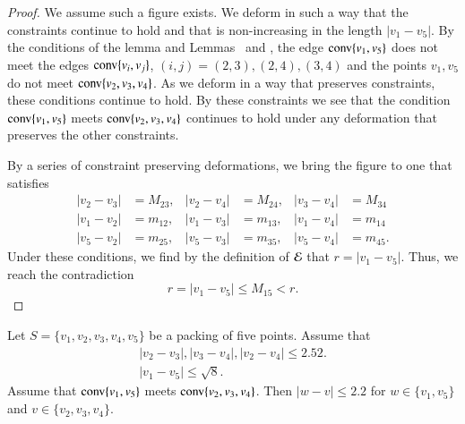 \begin{tarskidata}
\begin{tarski}
\begin{proof}
We assume such a figure exists.  We deform in such a way that the constraints continue
to hold and that is non-increasing in the length $|v_1-v_5|$.  By the conditions of the
lemma and Lemmas~ and , 
the edge ${\operatorname{conv}}\{v_1,v_5\}$
does not meet the
 edges ${\operatorname{conv}}\{v_i,v_j\}$, $(i,j)=(2,3),(2,4),(3,4)$ 
and the points $v_1,v_5$
do not meet ${\operatorname{conv}}\{v_2,v_3,v_4\}$.  As we deform in a way that preserves constraints,
these conditions continue to hold.  By these constraints we see that the condition
  ${\operatorname{conv}}\{v_1,v_5\}$ meets ${\operatorname{conv}}\{v_2,v_3,v_4\}$
continues to hold under any deformation that preserves the other constraints.

By a series of constraint preserving deformations, we bring the figure to one that satisfies
	$$
	\begin{array}{rlrlrl}
	|v_2-v_3|&=M_{23}, &|v_2-v_4| &= M_{24}, &|v_3-v_4| &= M_{34}\\
	|v_1-v_2|&=m_{12}, &|v_1-v_3| &= m_{13}, &|v_1-v_4| &= m_{14}\\
	|v_5-v_2|&=m_{25}, &|v_5-v_3| &= m_{35}, &|v_5-v_4| &= m_{45}.
	\end{array}
	$$
Under these conditions, we find by the definition of ${\mathcal E}$ 
that $r = |v_1-v_5|$.  Thus, we reach the contradiction
	$$
	r = |v_1-v_5| \le M_{15} < r.
	$$
\end{proof}
\end{tarski}





\begin{tarski}

\begin{lemma} 
Let $S=\{v_1,v_2,v_3,v_4,v_5\}$ be a packing of five points.
Assume that
	$$
	\begin{array}{lll}
	|v_2-v_3|, |v_3-v_4|, |v_2-v_4|\le 2.52.\\
	|v_1-v_5|\le \sqrt8.
	\end{array}
	$$
Assume that ${\operatorname{conv}}\{v_1,v_5\}$ meets ${\operatorname{conv}}\{v_2,v_3,v_4\}$.
Then $|w-v|\le 2.2$ for $w\in\{v_1,v_5\}$ and $v\in\{v_2,v_3,v_4\}$.
\end{lemma}


\end{tarski}
\end{tarskidata}
